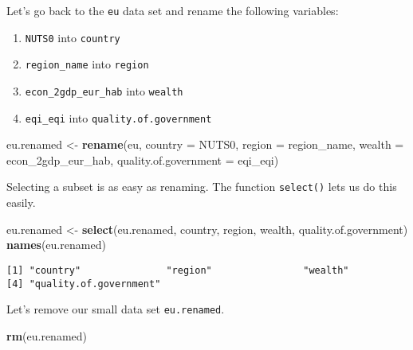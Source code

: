 \documentclass[]{article}
\newenvironment{Shaded}{\begin{snugshade}}{\end{snugshade}}
\newcommand{\DataTypeTok}[1]{\textcolor[rgb]{0.13,0.29,0.53}{#1}}
\newcommand{\KeywordTok}[1]{\textcolor[rgb]{0.13,0.29,0.53}{\textbf{#1}}}
\newcommand{\NormalTok}[1]{#1}
\newcommand{\StringTok}[1]{\textcolor[rgb]{0.31,0.60,0.02}{#1}}
\providecommand{\tightlist}{%
  \setlength{\itemsep}{0pt}\setlength{\parskip}{0pt}}
\begin{document}
Let's go back to the \texttt{eu} data set and rename the following variables:

\begin{enumerate}
\def\labelenumi{\arabic{enumi}.}
\tightlist
\item
  \texttt{NUTS0} into \texttt{country}
\item
  \texttt{region\_name} into \texttt{region}
\item
  \texttt{econ\_2gdp\_eur\_hab} into \texttt{wealth}
\item
  \texttt{eqi\_eqi} into \texttt{quality.of.government}
\end{enumerate}

\begin{Shaded}
\begin{Highlighting}[]
\NormalTok{eu.renamed <-}\StringTok{ }\KeywordTok{rename}\NormalTok{(eu,}
                     \DataTypeTok{country =}\NormalTok{ NUTS0,}
                     \DataTypeTok{region =}\NormalTok{ region_name,}
                     \DataTypeTok{wealth =}\NormalTok{ econ_2gdp_eur_hab,}
                     \DataTypeTok{quality.of.government =}\NormalTok{ eqi_eqi)}
\end{Highlighting}
\end{Shaded}

Selecting a subset is as easy as renaming. The function \texttt{select()} lets us do this easily.

\begin{Shaded}
\begin{Highlighting}[]
\NormalTok{eu.renamed <-}\StringTok{ }\KeywordTok{select}\NormalTok{(eu.renamed,}
\NormalTok{                     country, region, wealth, quality.of.government)}
\KeywordTok{names}\NormalTok{(eu.renamed)}
\end{Highlighting}
\end{Shaded}

\begin{verbatim}
[1] "country"               "region"                "wealth"               
[4] "quality.of.government"
\end{verbatim}

Let's remove our small data set \texttt{eu.renamed}.

\begin{Shaded}
\begin{Highlighting}[]
\KeywordTok{rm}\NormalTok{(eu.renamed)}
\end{Highlighting}
\end{Shaded}
\end{document}
